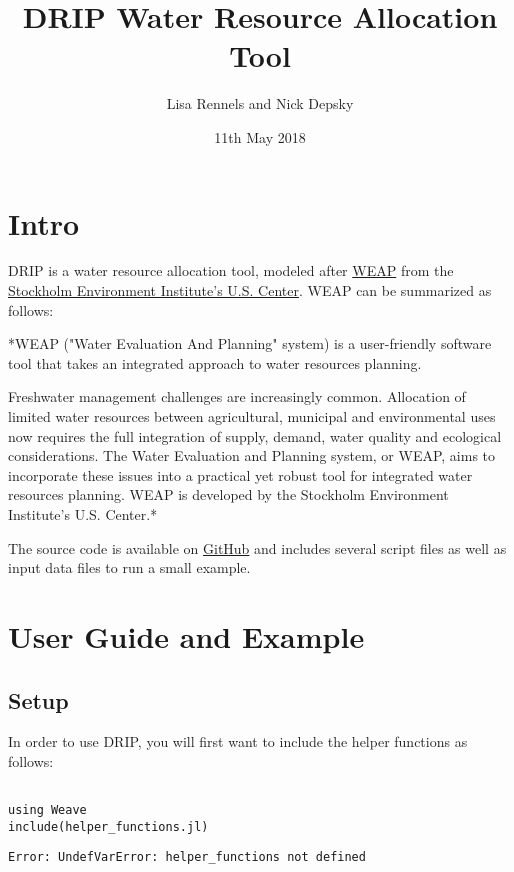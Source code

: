 \documentclass[12pt,a4paper]{article}
\title{ DRIP Water Resource Allocation Tool }
\author{ Lisa Rennels and Nick Depsky }
\date{ 11th May 2018 }
\begin{document}
\maketitle

\section{Intro}
DRIP is a water resource allocation tool, modeled after \href{http://weap21.org}{WEAP} from the \href{https://www.sei.org/centres/us/}{Stockholm Environment Institute's U.S. Center}. WEAP can be summarized as follows:

*WEAP ("Water Evaluation And Planning" system) is a user-friendly software tool  that takes an integrated approach to water resources planning.

Freshwater management challenges are increasingly common. Allocation of limited  water resources between agricultural, municipal and environmental uses now  requires the full integration of supply, demand, water quality and ecological  considerations. The Water Evaluation and Planning system, or WEAP, aims to  incorporate these issues into a practical yet robust tool for integrated water  resources planning. WEAP is developed by the Stockholm Environment Institute's  U.S. Center.*

The source code is available on \href{https://github.com/lrennels/ER290A-finalproject}{GitHub}  and includes several script files as well as input data files to run a small example.

\section{User Guide and Example}
\subsection{Setup}
In order to use DRIP, you will first want to include the helper functions as follows:


\begin{verbatim}

using Weave
include(helper_functions.jl)

\end{verbatim}

\begin{verbatim}
Error: UndefVarError: helper_functions not defined
\end{verbatim}
\end{document}
